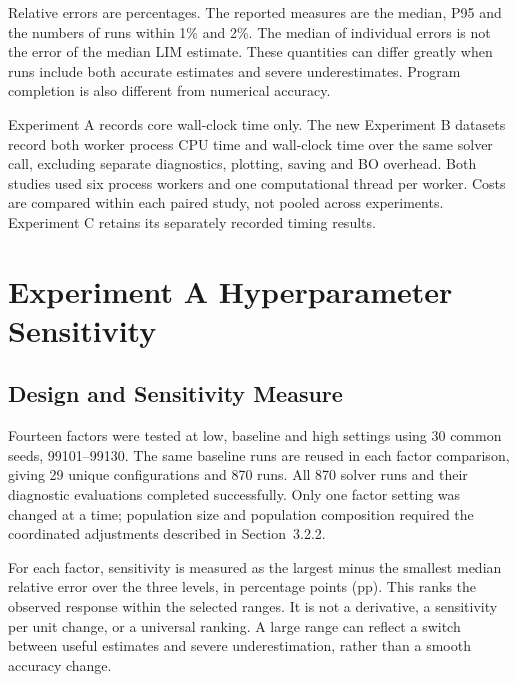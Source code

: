 

\begin{bluerevision}
Relative errors are percentages. The reported measures are the median, P95 and the numbers of runs within 1\% and 2\%. The median of individual errors is not the error of the median LIM estimate. These quantities can differ greatly when runs include both accurate estimates and severe underestimates. Program completion is also different from numerical accuracy.

Experiment A records core wall-clock time only. The new Experiment B datasets record both worker process CPU time and wall-clock time over the same solver call, excluding separate diagnostics, plotting, saving and BO overhead. Both studies used six process workers and one computational thread per worker. Costs are compared within each paired study, not pooled across experiments. Experiment C retains its separately recorded timing results.
\end{bluerevision}

\section{Experiment A Hyperparameter Sensitivity}
\label{sec:experiment-a}

\subsection{Design and Sensitivity Measure}
\begin{revision}
Fourteen factors were tested at low, baseline and high settings using 30 common seeds, 99101--99130. The same baseline runs are reused in each factor comparison, giving 29 unique configurations and 870 runs. All 870 solver runs and their diagnostic evaluations completed successfully. Only one factor setting was changed at a time; population size and population composition required the coordinated adjustments described in Section~3.2.2.

For each factor, sensitivity is measured as the largest minus the smallest median relative error over the three levels, in percentage points (pp). This ranks the observed response within the selected ranges. It is not a derivative, a sensitivity per unit change, or a universal ranking. A large range can reflect a switch between useful estimates and severe underestimation, rather than a smooth accuracy change.
\end{revision}

